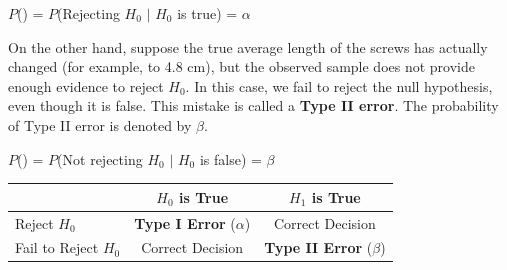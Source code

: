 \documentclass[twoside]{book}
\begin{document}
\begin{textbox}
    $P$()  = $P$(Rejecting $H_0$ $\mid$ $H_0$ is true) = $\alpha$
\end{textbox}

On the other hand, suppose the true average length of the screws has actually changed (for example, to 4.8 cm), but the observed sample does not provide enough evidence to reject $H_0$. In this case, we fail to reject the null hypothesis, even though it is false. This mistake is called a \textbf{Type II error}. The probability of Type II error is denoted by $\beta$.

\begin{textbox}
    $P$() = $P$(Not rejecting $H_0$ $\mid$ $H_0$ is false) = $\beta$
\end{textbox}

\begin{table}[h!]
\centering
\vspace{0.5em}
\renewcommand{\arraystretch}{1.5}
\begin{tabular}{l|c|c}

 & $H_0$ is True & $H_1$ is True \\
\hline
Reject $H_0$        & \textbf{Type I Error} ($\alpha$) & Correct Decision \\
Fail to Reject $H_0$ & Correct Decision        & \textbf{Type II Error} ($\beta$) \\
\end{tabular}
\end{table}

\begin{center}
\end{center}
\end{document}
